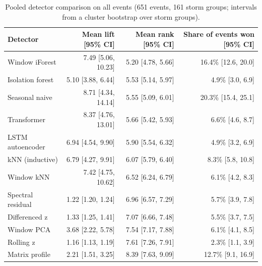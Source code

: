 \begin{table}[t]
\centering
\small
\begin{tabular}{lrrr}
\toprule
Detector & Mean lift [95\% CI] & Mean rank [95\% CI] & Share of events won [95\% CI] \\
\midrule
Window iForest & 7.49 [5.06, 10.23] & 5.20 [4.78, 5.66] & 16.4\% [12.6, 20.0] \\
Isolation forest & 5.10 [3.88, 6.44] & 5.53 [5.14, 5.97] & 4.9\% [3.0, 6.9] \\
Seasonal naive & 8.71 [4.34, 14.14] & 5.55 [5.09, 6.01] & 20.3\% [15.4, 25.1] \\
Transformer & 8.37 [4.76, 13.01] & 5.66 [5.42, 5.93] & 6.6\% [4.6, 8.7] \\
LSTM autoencoder & 6.94 [4.54, 9.90] & 5.90 [5.54, 6.32] & 4.9\% [3.2, 6.9] \\
kNN (inductive) & 6.79 [4.27, 9.91] & 6.07 [5.79, 6.40] & 8.3\% [5.8, 10.8] \\
Window kNN & 7.42 [4.75, 10.62] & 6.52 [6.24, 6.79] & 6.1\% [4.2, 8.3] \\
Spectral residual & 1.22 [1.20, 1.24] & 6.96 [6.57, 7.29] & 5.7\% [3.9, 7.8] \\
Differenced z & 1.33 [1.25, 1.41] & 7.07 [6.66, 7.48] & 5.5\% [3.7, 7.5] \\
Window PCA & 3.68 [2.22, 5.78] & 7.54 [7.17, 7.88] & 6.1\% [4.1, 8.5] \\
Rolling z & 1.16 [1.13, 1.19] & 7.61 [7.26, 7.91] & 2.3\% [1.1, 3.9] \\
Matrix profile & 2.21 [1.51, 3.25] & 8.39 [7.63, 9.09] & 12.7\% [9.1, 16.9] \\
\bottomrule
\end{tabular}
\caption{Pooled detector comparison on all events (651 events, 161 storm groups; intervals from a cluster bootstrap over storm groups).}
\label{tab:step10-pooled}
\end{table}